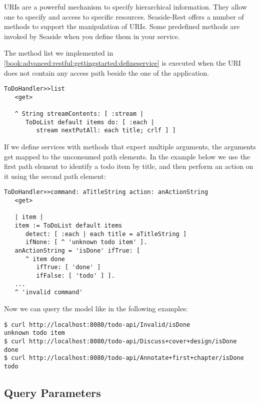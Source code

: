 \documentclass[a4paper,10pt,twoside]{book}
\newcommand{\ct}[1]{{\small\ttfamily\textup{#1}}}
\begin{document}
URIs are a powerful mechanism to specify hierarchical information. They allow one to specify and access to specific resources. Seaside-Rest offers a number of methods to support the manipulation of URIs. Some predefined methods are invoked by Seaside when you define them in your service. 

The method \ct{list} we implemented in \autoref{book:advanced:restful:gettingstarted:defineservice} is executed when the URI does not contain any access path beside the one of the application.

\begin{lstlisting}
ToDoHandler>>list
   <get>
   	
   ^ String streamContents: [ :stream |
      ToDoList default items do: [ :each |
         stream nextPutAll: each title; crlf ] ]
\end{lstlisting}

If we define services with methods that expect multiple arguments, the arguments get mapped to the unconsumed path elements. In the example below we use the first path element to identify a todo item by title, and then perform an action on it using the second path element:

\begin{lstlisting}
ToDoHandler>>command: aTitleString action: anActionString
   <get>

   | item |
   item := ToDoList default items
      detect: [ :each | each title = aTitleString ]
      ifNone: [ ^ 'unknown todo item' ].
   anActionString = 'isDone' ifTrue: [
      ^ item done
         ifTrue: [ 'done' ]
         ifFalse: [ 'todo' ] ].
   ...
   ^ 'invalid command'
\end{lstlisting}

Now we can query the model like in the following examples:

\begin{lstlisting}
$ curl http://localhost:8080/todo-api/Invalid/isDone
unknown todo item
$ curl http://localhost:8080/todo-api/Discuss+cover+design/isDone
done
$ curl http://localhost:8080/todo-api/Annotate+first+chapter/isDone
todo
\end{lstlisting}

\subsection{Query Parameters}
\label{book:advanced:restful:matching:queryparameters}
\end{document}
